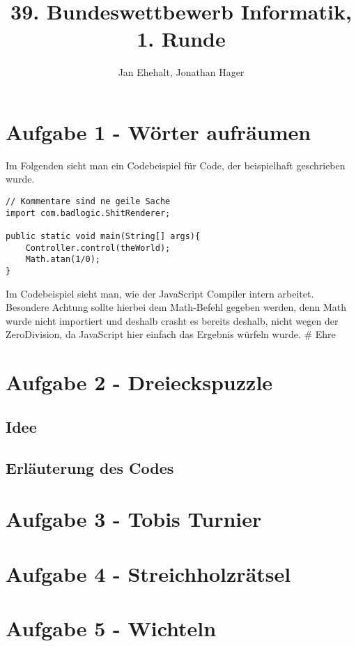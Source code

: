 \documentclass[a4paper, 12pt]{scrartcl}
\title{39. Bundeswettbewerb Informatik, 1. Runde}
\author{Jan Ehehalt, Jonathan Hager}
\date{}
\begin{document}
\maketitle
\newpage
\tableofcontents
\newpage

\section{Aufgabe 1 - Wörter aufräumen}

Im Folgenden sieht man ein Codebeispiel für Code, der beispielhaft geschrieben wurde.

\begin{lstlisting}
// Kommentare sind ne geile Sache
import com.badlogic.ShitRenderer;

public static void main(String[] args){
    Controller.control(theWorld);
    Math.atan(1/0);
}
\end{lstlisting}

Im Codebeispiel sieht man, wie der JavaScript Compiler intern arbeitet. Besondere Achtung sollte hierbei dem Math-Befehl gegeben werden, denn Math wurde nicht importiert und deshalb crasht es bereits deshalb, nicht wegen der ZeroDivision, da JavaScript hier einfach das Ergebnis würfeln wurde. \# Ehre

\section{Aufgabe 2 - Dreieckspuzzle}
\subsection{Idee}
\subsection{Erläuterung des Codes}

\section{Aufgabe 3 - Tobis Turnier}
\section{Aufgabe 4 - Streichholzrätsel}
\section{Aufgabe 5 - Wichteln}

\end{document}
